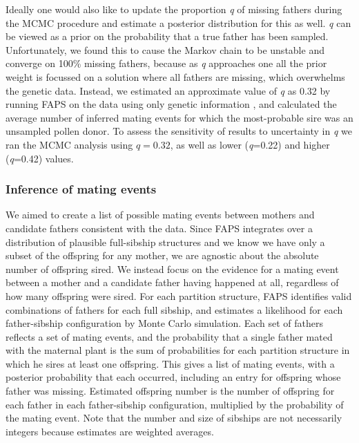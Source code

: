 \documentclass[10pt, a4paper, twocolumn]{article} %
\begin{document}
Ideally one would also like to update the proportion \textit{q} of missing fathers during the MCMC procedure and estimate a posterior distribution for this as well. \textit{q} can be viewed as a prior on the probability that a true father has been sampled. Unfortunately, we found this to cause the Markov chain to be unstable and converge on 100\% missing fathers, because as \textit{q} approaches one all the prior weight is focussed on a solution where all fathers are missing, which overwhelms the genetic data. Instead, we estimated an approximate value of \textit{q} as 0.32 by running FAPS on the data using only genetic information \cite{ellis2018efficient}, and calculated the average number of inferred mating events for which the most-probable sire was an unsampled pollen donor. To assess the sensitivity of results to uncertainty in \textit{q} we ran the MCMC analysis using $q=0.32$, as well as lower (\textit{q}=0.22) and higher (\textit{q}=0.42) values.

\subsubsection{Inference of mating events}

We aimed to create a list of possible mating events between mothers and candidate fathers consistent with the data. Since FAPS integrates over a distribution of plausible full-sibship structures and we know we have only a subset of the offspring for any mother, we are agnostic about the absolute number of offspring sired. We instead focus on the evidence for a mating event between a mother and a candidate father having happened at all, regardless of how many offspring were sired. For each partition structure, FAPS identifies valid combinations of fathers for each full sibship, and estimates a likelihood for each father-sibship configuration by Monte Carlo simulation. Each set of fathers reflects a set of mating events, and the probability that a single father mated with the maternal plant is the sum of probabilities for each partition structure in which he sires at least one offspring. This gives a list of mating events, with a posterior probability that each occurred, including an entry for offspring whose father was missing. Estimated offspring number is the number of offspring for each father in each father-sibship configuration, multiplied by the probability of the mating event. Note that the number and size of sibships are not necessarily integers because estimates are weighted averages.
\end{document}
